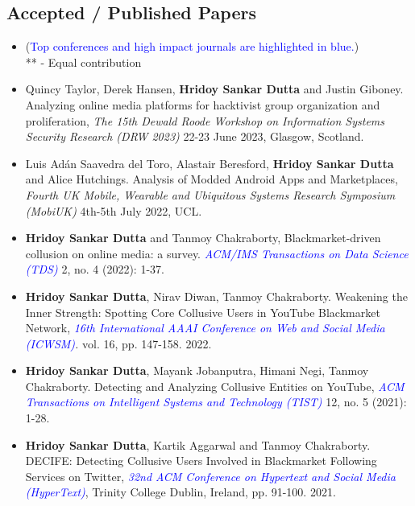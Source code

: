 \documentclass[margin, centered,lmodern]{res}
\begin{document}
\begin{resume}
\section{Accepted / Published Papers}
\begin{itemize}[leftmargin=*]
\item[] (\textcolor{blue}{Top conferences and high impact journals are highlighted in blue.}) \\ ** - Equal contribution

\item Quincy Taylor,  Derek Hansen,  \textbf{Hridoy Sankar Dutta} and Justin Giboney. Analyzing online media platforms for hacktivist group organization and proliferation,  \textit{The 15th Dewald Roode Workshop on Information Systems Security Research (DRW 2023)} 22-23 June 2023, Glasgow, Scotland.

\item Luis Adán Saavedra del Toro,  Alastair Beresford,  \textbf{Hridoy Sankar Dutta} and Alice Hutchings. Analysis of Modded Android Apps and Marketplaces,  \textit{Fourth UK Mobile, Wearable and Ubiquitous Systems Research Symposium (MobiUK)} 4th-5th July 2022, UCL.

\item \textbf{Hridoy Sankar Dutta} and Tanmoy Chakraborty, Blackmarket-driven collusion on online media: a survey.  \textit{\textcolor{blue}{ACM/IMS Transactions on Data Science (TDS)}} 2, no. 4 (2022): 1-37.

\item \textbf{Hridoy Sankar Dutta}, Nirav Diwan, Tanmoy Chakraborty. Weakening the Inner Strength: Spotting Core Collusive Users in YouTube Blackmarket Network,  \textit{\textcolor{blue}{16th International AAAI Conference on Web and Social Media (ICWSM)}.}  vol. 16, pp. 147-158. 2022.

\item \textbf{Hridoy Sankar Dutta}, Mayank Jobanputra, Himani Negi, Tanmoy Chakraborty. Detecting and Analyzing Collusive Entities on YouTube,   \textit{\textcolor{blue}{ACM Transactions on Intelligent Systems and Technology (TIST)}} 12, no. 5 (2021): 1-28.

\item \textbf{Hridoy Sankar Dutta}, Kartik Aggarwal and Tanmoy Chakraborty. DECIFE: Detecting Collusive Users Involved in Blackmarket Following Services on Twitter, \textit{\textcolor{blue}{32nd ACM Conference on Hypertext and Social Media (HyperText)}}, Trinity College Dublin, Ireland,  pp. 91-100. 2021.


\end{itemize}
\end{resume}
\end{document}
